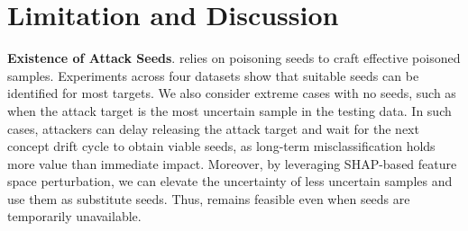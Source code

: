 
\section{Limitation and Discussion}

\textbf{Existence of Attack Seeds}.
\pandora relies on poisoning seeds to craft effective poisoned samples.
Experiments across four datasets show that suitable seeds can be identified for most targets.
We also consider extreme cases with no seeds, such as when the attack target is the most uncertain sample in the testing data.
In such cases, attackers can delay releasing the attack target and wait for the next concept drift cycle to obtain viable seeds, as long-term misclassification holds more value than immediate impact.
Moreover, by leveraging SHAP-based feature space perturbation, we can elevate the uncertainty of less uncertain samples and use them as substitute seeds. 
Thus, \pandora remains feasible even when seeds are temporarily unavailable.

